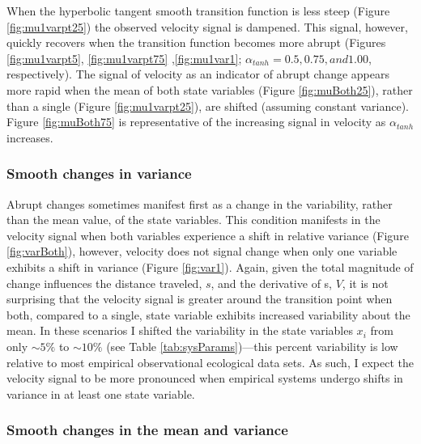 \documentclass[12pt,twoside,openany]{reedthesis}
\begin{document}
When the hyperbolic tangent smooth transition function is less steep (Figure \ref{fig:mu1varpt25}) the observed velocity signal is dampened. This signal, however, quickly recovers when the transition function becomes more abrupt (Figures \ref{fig:mu1varpt5}, \ref{fig:mu1varpt75} ,\ref{fig:mu1var1}; \(\alpha_{tanh}=0.5, 0.75, and 1.00\), respectively). The signal of velocity as an indicator of abrupt change appears more rapid when the mean of both state variables (Figure \ref{fig:muBoth25}), rather than a single (Figure \ref{fig:mu1varpt25}), are shifted (assuming constant variance). Figure \ref{fig:muBoth75} is representative of the increasing signal in velocity as \(\alpha_{tanh}\) increases.

\hypertarget{smooth-changes-in-variance}{%
\subsubsection{Smooth changes in variance}\label{smooth-changes-in-variance}}

Abrupt changes sometimes manifest first as a change in the variability, rather than the mean value, of the state variables. This condition manifests in the velocity signal when both variables experience a shift in relative variance (Figure \ref{fig:varBoth}), however, velocity does not signal change when only one variable exhibits a shift in variance (Figure \ref{fig:var1}). Again, given the total magnitude of change influences the distance traveled, \(s\), and the derivative of s, \(V\), it is not surprising that the velocity signal is greater around the transition point when both, compared to a single, state variable exhibits increased variability about the mean. In these scenarios I shifted the variability in the state variables \(x_i\) from only \(\sim 5\%\) to \(\sim10\%\) (see Table \ref{tab:sysParams})---this percent variability is low relative to most empirical observational ecological data sets. As such, I expect the velocity signal to be more pronounced when empirical systems undergo shifts in variance in at least one state variable.

\hypertarget{smooth-changes-in-the-mean-and-variance}{%
\subsubsection{Smooth changes in the mean and variance}\label{smooth-changes-in-the-mean-and-variance}}
\end{document}
